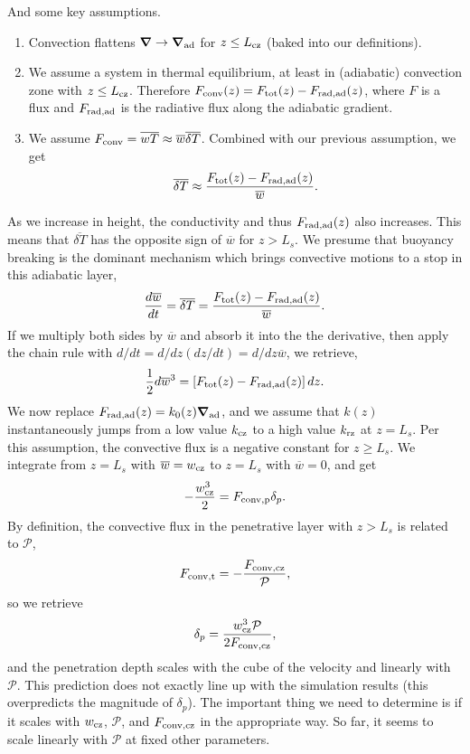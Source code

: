 \documentclass[12pt,preprint]{article}
\renewcommand{\vec}[1]{\boldsymbol{#1}}
\newcommand{\grad}{\vec{\nabla}}
\begin{document}
And some key assumptions.
\begin{enumerate}
\item Convection flattens $\grad \rightarrow \grad_{\rm{ad}}$ for $z \leq L_{\rm{cz}}$ (baked into our definitions).
\item We assume a system in thermal equilibrium, at least in (adiabatic) convection zone with $z \leq L_{\rm{cz}}$.
Therefore $F_{\rm{conv}}(z) = F_{\rm{tot}}(z) - F_{\rm{rad, ad}}(z)$, where $F$ is a flux and $F_{\rm{rad, ad}}$ is the radiative flux along the adiabatic gradient.
\item We assume $F_{\rm{conv}} = \overline{w T} \approx \overline{w}\overline{\delta T}$.
Combined with our previous assumption, we get
\begin{equation}
\overline{\delta T} \approx \frac{F_{\rm{tot}}(z) - F_{\rm{rad, ad}}(z)}{\overline{w}}.
\end{equation}
\end{enumerate}
As we increase in height, the conductivity and thus $F_{\rm{rad, ad}}(z)$ also increases.
This means that $\overline{\delta T}$ has the opposite sign of $\overline{w}$ for $z > L_s$.
We presume that buoyancy breaking is the dominant mechanism which brings convective motions to a stop in this adiabatic layer,
\begin{equation}
\frac{d \overline{w}}{dt} = \overline{\delta T} = \frac{F_{\rm{tot}}(z) - F_{\rm{rad, ad}}(z)}{\overline{w}}.
\end{equation}
If we multiply both sides by $\overline{w}$ and absorb it into the the derivative, then apply the chain rule with $d/dt = d/dz (dz/dt) = d/dz \overline{w}$, we retrieve,
\begin{equation}
\frac{1}{2} d\overline{w}^3 = \left[F_{\rm{tot}}(z) - F_{\rm{rad, ad}}(z)\right]dz.
\end{equation}
We now replace $F_{\rm{rad, ad}}(z) = k_0(z) \grad_{\rm{ad}}$, and we assume that $k(z)$ instantaneously jumps from a low value $k_{\rm{cz}}$ to a high value $k_{\rm{rz}}$ at $z = L_s$.
Per this assumption, the convective flux is a negative constant for $z \geq L_s$.
We integrate from $z = L_s$ with $\overline{w} = w_{\rm{cz}}$ to $z = L_{s}$ with $\overline{w} = 0$, and get
\begin{equation}
-\frac{w_{\rm{cz}}^3}{2} = F_{\rm{conv,p}} \delta_p.
\end{equation}
By definition, the convective flux in the penetrative layer with $z > L_s$ is related to $\mathcal{P}$,
\begin{equation}
F_{\rm{conv,t}} = -\frac{F_{\rm{conv,cz}}}{\mathcal{P}},
\end{equation}
so we retrieve
\begin{equation}
\delta_p = \frac{w_{\rm{cz}}^3 \mathcal{P}}{2 F_{\rm{conv, cz}}},
\end{equation}
and the penetration depth scales with the cube of the velocity and linearly with $\mathcal{P}$.
This prediction does not exactly line up with the simulation results (this overpredicts the magnitude of $\delta_p$).
The important thing we need to determine is if it scales with $w_{\rm{cz}}$, $\mathcal{P}$, and $F_{\rm{conv,cz}}$ in the appropriate way.
So far, it seems to scale linearly with $\mathcal{P}$ at fixed other parameters.



\end{document}
